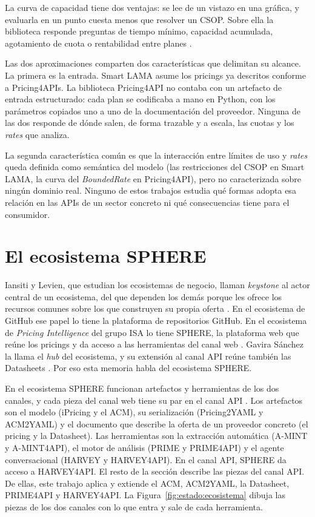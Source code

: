 La curva de capacidad tiene dos ventajas: se lee de un vistazo en una
gráfica, y evaluarla en un punto cuesta menos que resolver un CSOP. Sobre
ella la biblioteca responde preguntas de tiempo mínimo, capacidad
acumulada, agotamiento de cuota o rentabilidad entre planes
\citep{gavira2025tfg}.

Las dos aproximaciones comparten dos características que delimitan su
alcance. La primera es la entrada. Smart LAMA asume los pricings ya
descritos conforme a Pricing4APIs. La biblioteca Pricing4API no contaba
con un artefacto de entrada estructurado: cada plan se codificaba a mano
en Python, con los parámetros copiados uno a uno de la documentación del
proveedor. Ninguna de las dos responde de dónde salen, de forma trazable
y a escala, las cuotas y los \textit{rates} que analiza.

La segunda característica común es que la interacción entre límites de
uso y \textit{rates} queda definida como semántica del modelo (las
restricciones del CSOP en Smart LAMA, la curva del \textit{BoundedRate} en
Pricing4API), pero no caracterizada sobre ningún dominio real. Ninguno de estos trabajos estudia qué formas
adopta esa relación en las APIs de un sector concreto ni qué
consecuencias tiene para el consumidor.

\section{El ecosistema SPHERE}
\label{sec:estado:acm}

Iansiti y Levien, que estudian los ecosistemas de negocio, llaman
\textit{keystone} al actor central de un ecosistema, del que dependen los demás porque les ofrece los recursos
comunes sobre los que construyen su propia oferta
\citep{iansiti2004keystone}. En el ecosistema de GitHub ese papel lo
tiene la plataforma de repositorios GitHub. En el ecosistema de \textit{Pricing Intelligence}
del grupo ISA lo tiene SPHERE, la plataforma web que reúne los pricings
y da acceso a las herramientas del canal web \citep{sphere,gavira2026tfm}. Gavira Sánchez la
llama el \textit{hub} del ecosistema, y su extensión al canal API reúne
también las Datasheets \citep{gavira2026tfm}. Por eso esta memoria habla del ecosistema
SPHERE.

En el ecosistema SPHERE funcionan artefactos y herramientas de los dos
canales, y cada pieza del canal web tiene su par en el canal API
\citep{gavira2026tfm}. Los artefactos son el modelo (iPricing y el ACM),
su serialización (Pricing2YAML y ACM2YAML) y el documento que describe la
oferta de un proveedor concreto (el pricing y la Datasheet). Las
herramientas son la extracción automática (A-MINT y A-MINT4API), el motor
de análisis (PRIME y PRIME4API) y el agente conversacional (HARVEY y
HARVEY4API). En el canal API, SPHERE da acceso a HARVEY4API.
El resto de la sección describe las piezas del canal API. De ellas, este trabajo aplica y extiende el ACM, ACM2YAML, la
Datasheet, PRIME4API y HARVEY4API. La
Figura~\ref{fig:estado:ecosistema} dibuja las piezas de los dos canales con
lo que entra y sale de cada herramienta.

